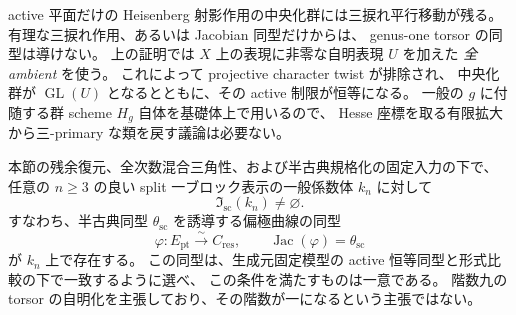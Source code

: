 \begin{remark}
active 平面だけの Heisenberg 射影作用の中央化群には三捩れ平行移動が残る。
有理な三捩れ作用、あるいは Jacobian 同型だけからは、
genus-one torsor の同型は導けない。
上の証明では $X$ 上の表現に非零な自明表現 $U$ を加えた
\emph{全 ambient} を使う。
これによって projective character twist が排除され、
中央化群が $\operatorname{GL}(U)$ となるとともに、その active 制限が恒等になる。
一般の $g$ に付随する群 scheme $H_g$ 自体を基礎体上で用いるので、
Hesse 座標を取る有限拡大から三-primary な類を戻す議論は必要ない。
\end{remark}

\begin{theorem}
\label{thm:nfm-generic-plane-isom-splitting}
本節の残余復元、全次数混合三角性、および半古典規格化の固定入力の下で、
任意の $n\ge3$ の良い split 一ブロック表示の一般係数体 $k_n$ に対して
\[
 \mathfrak I_{\mathrm{sc}}(k_n)\ne\varnothing.
\]
すなわち、半古典同型 $\theta_{\mathrm{sc}}$ を誘導する偏極曲線の同型
\[
 \varphi:E_{\mathrm{pt}}\xrightarrow{\sim}C_{\mathrm{res}},\qquad
 \operatorname{Jac}(\varphi)=\theta_{\mathrm{sc}}
\]
が $k_n$ 上で存在する。
この同型は、生成元固定模型の active 恒等同型と形式比較の下で一致するように選べ、
この条件を満たすものは一意である。
階数九の torsor の自明化を主張しており、その階数が一になるという主張ではない。
\end{theorem}

